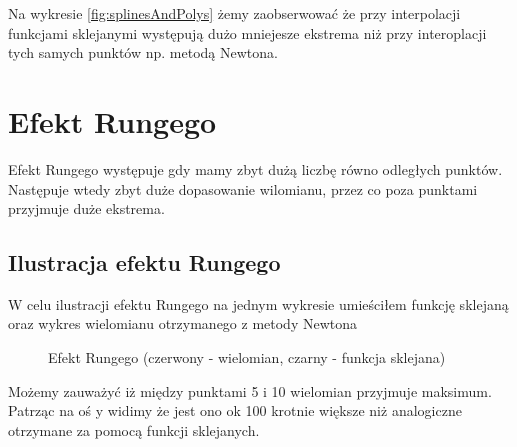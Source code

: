 \documentclass{article}
\begin{document}
    Na wykresie \ref{fig:splinesAndPolys} żemy zaobserwować że przy interpolacji funkcjami sklejanymi występują dużo mniejesze ekstrema niż przy interoplacji tych samych punktów np. metodą Newtona.

    \pagebreak

    \section{Efekt Rungego}
    Efekt Rungego występuje gdy mamy zbyt dużą liczbę równo odległych punktów. Następuje wtedy zbyt duże dopasowanie wilomianu, 
    przez co poza punktami przyjmuje duże ekstrema.
    \subsection{Ilustracja efektu Rungego}
    W celu ilustracji efektu Rungego na jednym wykresie umieściłem funkcję sklejaną oraz wykres wielomianu otrzymanego z metody Newtona
    \begin{figure}[h]
        \caption{\label{fig:rungeg} Efekt Rungego (czerwony - wielomian, czarny - funkcja sklejana)}
    \end{figure}
    
    Możemy zauważyć iż między punktami 5 i 10 wielomian przyjmuje maksimum. Patrząc na oś y widimy że jest ono ok 100 krotnie większe niż analogiczne otrzymane
    za pomocą funkcji sklejanych.
\end{document}

